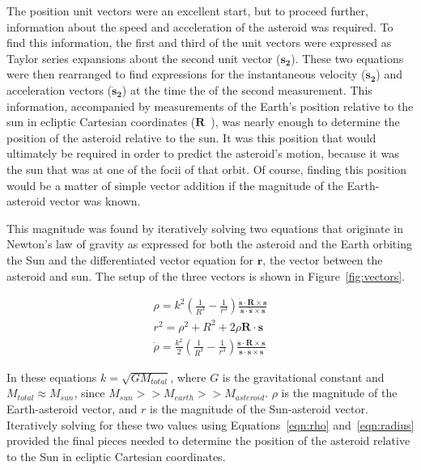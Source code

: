 \documentclass[a4paper,12pt]{article}
\begin{document}
The position unit vectors were an excellent start, but to proceed further, information about the speed and acceleration of the asteroid was required. To find this information, the first and third of the unit vectors were expressed as Taylor series expansions about the second unit vector ($\mathbf{s_2}$). These two equations were then rearranged to find expressions for the instantaneous velocity ($\mathbf{\dot{s}_2}$) and acceleration vectors ($\mathbf{\ddot{s}_2}$) at the time the of the second measurement. This information, accompanied by measurements of the Earth's position relative to the sun in ecliptic Cartesian coordinates ($\mathbf{R}$~\citep{urania}), was nearly enough to determine the position of the asteroid relative to the sun. It was this position that would ultimately be required in order to predict the asteroid's motion, because it was the sun that was at one of the focii of that orbit. Of course, finding this position would be a matter of simple vector addition if the magnitude of the Earth-asteroid vector was known.

This magnitude was found by iteratively solving two equations that originate in Newton's law of gravity as expressed for both the asteroid and the Earth orbiting the Sun and the differentiated vector equation for $\mathbf{r}$, the vector between the asteroid and sun. The setup of the three vectors is shown in Figure~\ref{fig:vectors}.

\begin{eqnarray}
\label{eqn:rho}
\rho = k^2\left(\frac{1}{R^3}-\frac{1}{r^3}\right)\frac{\mathbf{\dot{s}}\cdot\mathbf{R}\times\mathbf{s}}{\mathbf{\dot{s}}\cdot\mathbf{\ddot{s}}\times\mathbf{s}}\\
\label{eqn:radius}
r^2 = \rho^2 + R^2 + 2\rho\mathbf{R}\cdot\mathbf{s}\\
\dot{\rho} = \frac{k^2}{2}\left(\frac{1}{R^3}-\frac{1}{r^3}\right)\frac{\mathbf{\ddot{s}}\cdot\mathbf{R}\times\mathbf{s}}{\mathbf{\ddot{s}}\cdot\mathbf{\dot{s}}\times\mathbf{s}}
\label{eqn:rhodot}
\end{eqnarray}

In these equations $k = \sqrt{GM_{total}}$, where $G$ is the gravitational constant and $M_{total} \approx M_{sun}$, since $M_{sun} >> M_{earth} >> M_{asteroid}$. $\rho$ is the magnitude of the Earth-asteroid vector, and $r$ is the magnitude of the Sun-asteroid vector. Iteratively solving for these two values using Equations~\ref{eqn:rho} and~\ref{eqn:radius} provided the final pieces needed to determine the position of the asteroid relative to the Sun in ecliptic Cartesian coordinates.
\end{document}
